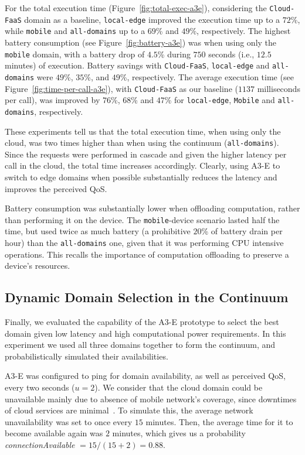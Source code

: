 For the total execution time (Figure~\ref{fig:total-exec-a3e}), considering the \texttt{Cloud-FaaS} domain as a baseline, \texttt{local-edge} improved the execution time up to a $72$\%, while \texttt{mobile} and \texttt{all-domains} up to a $69$\% and $49$\%, respectively. The highest battery consumption (see Figure~\ref{fig:battery-a3e}) was when using only the \texttt{mobile} domain, with a battery drop of $4.5$\% during $750$ seconds (i.e., $12.5$ minutes) of execution. Battery savings with \texttt{Cloud-FaaS}, \texttt{local-edge} and \texttt{all-domains} were $49$\%, $35$\%, and $49$\%, respectively. The average execution time (see Figure~\ref{fig:time-per-call-a3e}), with \texttt{Cloud-FaaS} as our baseline ($1137$ milliseconds per call), was improved by $76$\%, $68$\% and $47$\% for \texttt{local-edge}, \texttt{Mobile} and \texttt{all-domains}, respectively. 

These experiments tell us that the total execution time, when using only the cloud, was two times higher than when using the continuum (\texttt{all-domains}). Since the requests were performed in cascade and given the higher latency per call in the cloud, the total time increases accordingly. Clearly, using A3-E to switch to edge domains when possible substantially reduces the latency and improves the perceived QoS.

Battery consumption was substantially lower when offloading computation, rather than performing it on the device. The \texttt{mobile}-device scenario lasted half the time, but used twice as much battery (a prohibitive $20$\% of battery drain per hour) than the \texttt{all-domains} one, given that it was performing CPU intensive operations. This recalls the importance of computation offloading to preserve a device's resources.

\subsection{Dynamic Domain Selection in the Continuum}
\label{sub:domain-selection}

Finally, we evaluated the capability of the A3-E prototype to select the best domain given low latency and high computational power requirements. In this experiment we used all three domains together to form the continuum, and probabilistically simulated their availabilities. 

A3-E was configured to ping for domain availability, as well as perceived QoS, every two seconds ($u = 2$). We consider that the cloud domain could be unavailable mainly due to absence of mobile network's coverage, since downtimes of cloud services are minimal~\cite{garcia2017bandwidth}. To simulate this, the average network unavailability was set to once every $15$ minutes. Then, the average time for it to become available again was $2$ minutes, which gives us a probability \textit{connectionAvailable} $=15/(15+2)=0.88$.

